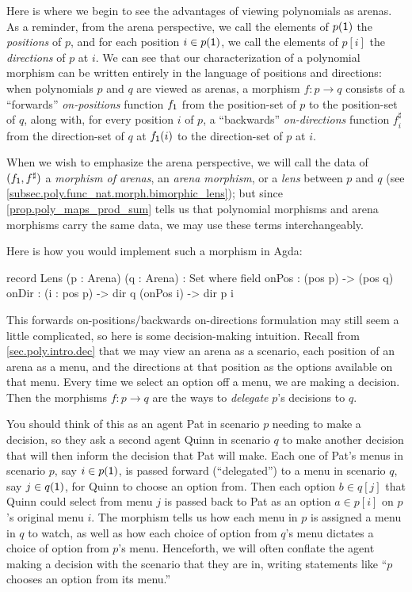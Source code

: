 \documentclass[Book-Poly]{subfiles}
\begin{document}
Here is where we begin to see the advantages of viewing polynomials as arenas.
As a reminder, from the arena perspective, we call the elements of $p(\textsf{1})$ the \emph{positions} of $p$, and for each position $i \in p(\textsf{1})$, we call the elements of $p[i]$ the \emph{directions} of $p$ at $i$.
We can see that our characterization of a polynomial morphism can be written entirely in the language of positions and directions: when polynomials $p$ and $q$ are viewed as arenas, a morphism $f \colon p \to q$ consists of a ``forwards'' \emph{on-positions} function $f_{\textsf{1}}$ from the position-set of $p$ to the position-set of $q$, along with, for every position $i$ of $p$, a ``backwards'' \emph{on-directions} function $f^\sharp_i$ from the direction-set of $q$ at $f_{\textsf{1}}(i)$ to the direction-set of $p$ at $i$.

When we wish to emphasize the arena perspective, we will call the data of $(f_{\textsf{1}}, f^\sharp)$ a \emph{morphism of arenas}, an \emph{arena morphism}, or a \emph{lens} between $p$ and $q$ (see \cref{subsec.poly.func_nat.morph.bimorphic_lens}); but since \cref{prop.poly_maps_prod_sum} tells us that polynomial morphisms and arena morphisms carry the same data, we may use these terms interchangeably.

Here is how you would implement such a morphism in Agda:
\begin{agda}
record Lens (p : Arena) (q : Arena) : Set where
   field
     onPos : (pos p) -> (pos q)
     onDir : (i : pos p) -> dir q (onPos i) -> dir p i
\end{agda}

This forwards on-positions/backwards on-directions formulation may still seem a little complicated, so here is some decision-making intuition.
Recall from \cref{sec.poly.intro.dec} that we may view an arena as a scenario, each position of an arena as a menu, and the directions at that position as the options available on that menu.
Every time we select an option off a menu, we are making a decision.
Then the morphisms $f\colon p\to q$ are the ways to \emph{delegate} $p$'s decisions to $q$.

You should think of this as an agent Pat in scenario $p$ needing to make a decision, so they ask a second agent Quinn in scenario $q$ to make another decision that will then inform the decision that Pat will make.
Each one of Pat's menus in scenario $p$, say $i\in p(\textsf{1})$, is passed forward (``delegated'') to a menu in scenario $q$, say $j\in q(\textsf{1})$, for Quinn to choose an option from.
Then each option $b\in q[j]$ that Quinn could select from menu $j$ is passed back to Pat as an option $a\in p[i]$ on $p$'s original menu $i$.
The morphism tells us how each menu in $p$ is assigned a menu in $q$ to watch, as well as how each choice of option from $q$'s menu dictates a choice of option from $p$'s menu.
Henceforth, we will often conflate the agent making a decision with the scenario that they are in, writing statements like ``$p$ chooses an option from its menu.''
\end{document}
